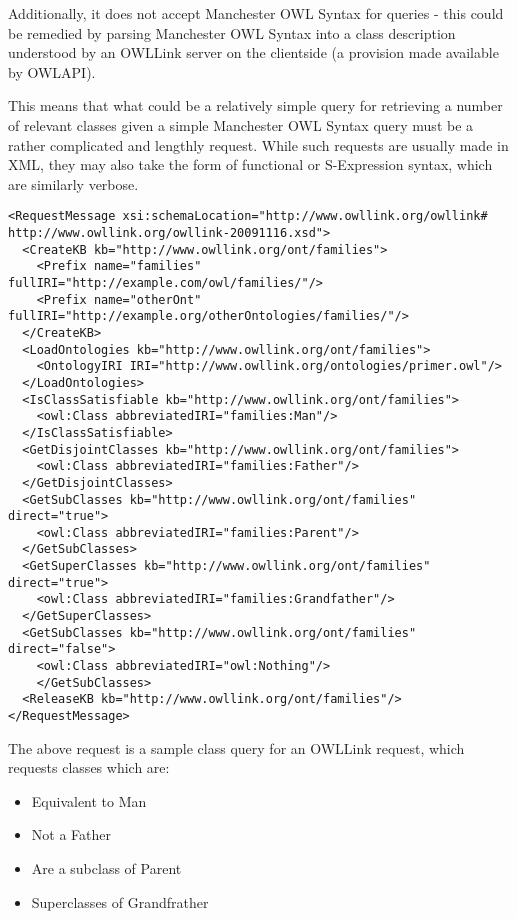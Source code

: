 \documentclass{article}
\begin{document}
Additionally, it does not accept Manchester OWL Syntax for queries - this could 
be remedied by parsing Manchester OWL Syntax into a class description understood 
by an OWLLink server on the clientside (a provision made available by OWLAPI).

This means that what could be a relatively simple query for retrieving a number
of relevant classes given a simple Manchester OWL Syntax query must be a rather
complicated and lengthly request. While such requests are usually made in XML,
they may also take the form of functional or S-Expression syntax, which
are similarly verbose.

\begin{lstlisting}
<RequestMessage xsi:schemaLocation="http://www.owllink.org/owllink# http://www.owllink.org/owllink-20091116.xsd">
  <CreateKB kb="http://www.owllink.org/ont/families">
    <Prefix name="families" fullIRI="http://example.com/owl/families/"/>
    <Prefix name="otherOnt" fullIRI="http://example.org/otherOntologies/families/"/>
  </CreateKB>
  <LoadOntologies kb="http://www.owllink.org/ont/families">
    <OntologyIRI IRI="http://www.owllink.org/ontologies/primer.owl"/>
  </LoadOntologies>
  <IsClassSatisfiable kb="http://www.owllink.org/ont/families">
    <owl:Class abbreviatedIRI="families:Man"/>
  </IsClassSatisfiable>
  <GetDisjointClasses kb="http://www.owllink.org/ont/families">
    <owl:Class abbreviatedIRI="families:Father"/>
  </GetDisjointClasses>
  <GetSubClasses kb="http://www.owllink.org/ont/families" direct="true">
    <owl:Class abbreviatedIRI="families:Parent"/>
  </GetSubClasses>
  <GetSuperClasses kb="http://www.owllink.org/ont/families" direct="true">
    <owl:Class abbreviatedIRI="families:Grandfather"/>
  </GetSuperClasses>
  <GetSubClasses kb="http://www.owllink.org/ont/families" direct="false">
    <owl:Class abbreviatedIRI="owl:Nothing"/>
    </GetSubClasses>
  <ReleaseKB kb="http://www.owllink.org/ont/families"/>
</RequestMessage>
\end{lstlisting}

The above request is a sample class query for an OWLLink request, which requests
classes which are:

\begin{itemize}
    \item Equivalent to Man
    \item Not a Father
    \item Are a subclass of Parent
    \item Superclasses of Grandfrather
\end{itemize}
\end{document}
